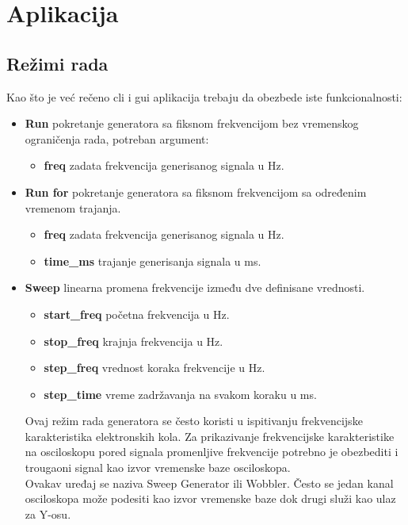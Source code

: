 \section{Aplikacija}

\subsection{Režimi rada}\label{working_modes}
Kao što je već rečeno \gls{cli} i \gls{gui} aplikacija trebaju da obezbede iste
funkcionalnosti:
\begin{itemize}
\item \label{run_mode} \textbf{Run} pokretanje generatora sa fiksnom frekvencijom bez vremenskog
  ograničenja rada, potreban argument:
  \begin{itemize}
    \item \textbf{freq} zadata frekvencija generisanog signala u Hz.
  \end{itemize}
\item \label{run_for_mode} \textbf{Run for} pokretanje generatora sa fiksnom frekvencijom sa
  određenim vremenom trajanja.
  \begin{itemize}
  \item \textbf{freq} zadata frekvencija generisanog signala u Hz.
  \item \textbf{time\_ms} trajanje generisanja signala u ms.
  \end{itemize}

\item \label{sweep_mode} \textbf{Sweep} linearna promena frekvencije između dve definisane
  vrednosti.
  \begin{itemize}
  \item \textbf{start\_freq} početna frekvencija u Hz.
  \item \textbf{stop\_freq}  krajnja frekvencija u Hz.
  \item \textbf{step\_freq}  vrednost koraka frekvencije u Hz.
  \item \textbf{step\_time}  vreme zadržavanja na svakom koraku u ms.
  \end{itemize}
  Ovaj režim rada generatora se često koristi u ispitivanju frekvencijske karakteristika
  elektronskih kola.
  Za prikazivanje frekvencijske karakteristike na osciloskopu pored signala promenljive
  frekvencije potrebno je obezbediti i trougaoni signal kao izvor vremenske baze
  osciloskopa. \\
  Ovakav uređaj se naziva Sweep Generator ili Wobbler.
  Često se jedan kanal osciloskopa može podesiti kao izvor vremenske baze dok
  drugi služi kao ulaz za Y-osu.

\end{itemize}

